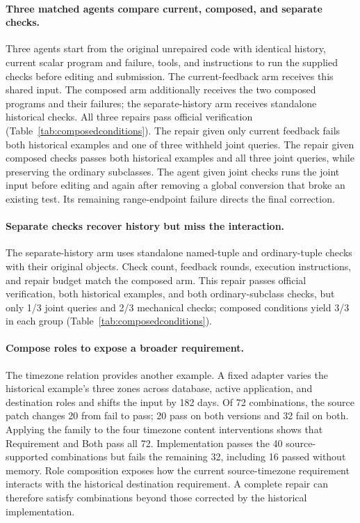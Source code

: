 \paragraph{Three matched agents compare current, composed, and separate checks.}
Three agents start from the original unrepaired code with identical history,
current scalar program and failure, tools, and instructions to run the
supplied checks before editing and submission. The current-feedback arm
receives this shared input. The composed arm additionally receives the two
composed programs and their failures; the separate-history arm receives
standalone historical checks. All three repairs pass official verification
(Table~\ref{tab:composedconditions}).
The repair given only current feedback fails both historical examples and
one of three withheld joint queries. The repair given composed checks
passes both historical examples and all three joint queries, while preserving
the ordinary subclasses.
The agent given joint checks runs the joint input before editing and again after
removing a global conversion that broke an existing test. Its remaining
range-endpoint failure directs the final correction.

\paragraph{Separate checks recover history but miss the interaction.}
The separate-history arm uses standalone named-tuple and ordinary-tuple
checks with their original objects.
Check count, feedback rounds, execution instructions, and repair budget match
the composed arm. This repair passes official verification, both historical
examples, and both ordinary-subclass checks, but only 1/3 joint queries and
2/3 mechanical checks; composed conditions yield 3/3 in each group
(Table~\ref{tab:composedconditions}).

\paragraph{Compose roles to expose a broader requirement.}
The timezone relation provides another example. A fixed adapter varies the
historical example's three zones across database, active application, and destination
roles and shifts the input by 182 days. Of 72 combinations, the source patch
changes 20 from fail to pass; 20 pass on both versions and 32 fail on both.
Applying the family to the four timezone content interventions shows that Requirement and
Both pass all 72. Implementation passes the 40 source-supported combinations
but fails the remaining 32, including 16 passed without memory.
Role composition exposes how the current source-timezone requirement interacts
with the historical destination requirement. A complete repair can therefore
satisfy combinations beyond those corrected by the historical implementation.

